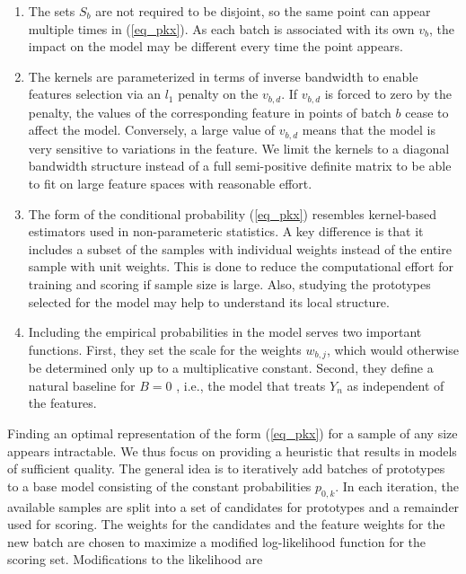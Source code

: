 %
\begin{remark}
\begin{enumerate}
\item The sets $S_b$ are not required to be disjoint, so the same point can appear multiple times in (\ref{eq_pkx}).
As each batch is associated with its own $v_b$, the impact on the model may be different every time the point appears.
%
\item The kernels are parameterized in terms of inverse bandwidth to enable features selection via an $l_1$ penalty on the $v_{b,d}$.
If $v_{b,d}$ is forced to zero by the penalty, the values of the corresponding feature in points of batch $b$ cease to affect the model.
Conversely, a large value of $v_{b,d}$ means that the model is very sensitive to variations in the feature.
We limit the kernels to a diagonal bandwidth structure instead of a full semi-positive definite matrix to be able to fit on large feature spaces with reasonable effort.
%
\item The form of the conditional probability (\ref{eq_pkx}) resembles kernel-based estimators used in non-parameteric statistics.
A key difference is that it includes a subset of the samples with individual weights instead of the entire sample with unit weights.
This is done to reduce the computational effort for training and scoring if sample size is large.
Also, studying the prototypes selected for the model may help to understand its local structure.
%
\item Including the empirical probabilities in the model serves two important functions.
First, they set the scale for the weights $w_{b,j}$, which would otherwise be determined only up to a multiplicative constant.
Second, they define a natural baseline for $B=0$ , i.e., the model that treats $Y_n$ as independent of the features.
\end{enumerate}
\end{remark}
%
Finding an optimal representation of the form (\ref{eq_pkx}) for a sample of any size appears intractable.
We thus focus on providing a heuristic that results in models of sufficient quality.
The general idea is to iteratively add batches of prototypes to a base model consisting of the constant probabilities $p_{0,k}$.
In each iteration, the available samples are split into a set of candidates for prototypes and a remainder used for scoring.
The weights for the candidates and the feature weights for the new batch are chosen to maximize a modified log-likelihood function for the scoring set.
Modifications to the likelihood are
